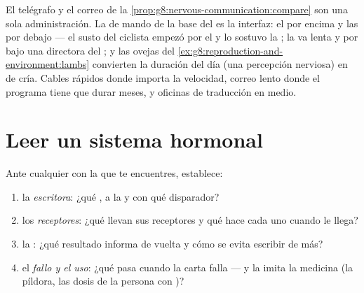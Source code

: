 \begin{remark}\label{rem:g8:hormonal-communication:partnership}
El telégrafo y el correo de la
\cref{prop:g8:nervous-communication:compare} son una sola
administración. La  de mando de la base del  es la
interfaz: el  por encima y las  por debajo ---
el susto del ciclista empezó por el  y lo sostuvo la ; la
 va lenta y por  bajo una directora del ; y las
ovejas del \cref{ex:g8:reproduction-and-environment:lambs} convierten
la duración del día (una percepción nerviosa) en  de cría.
Cables rápidos donde importa la velocidad, correo lento donde el
programa tiene que durar meses, y oficinas de traducción en medio.
\end{remark}

\section{Leer un sistema hormonal}

\begin{method}\label{met:g8:hormonal-communication:read}
Ante cualquier  con la que te encuentres, establece:
\begin{enumerate}
  \item la \emph{escritora}: ¿qué , a la  y con qué
        disparador?
  \item los \emph{receptores}: ¿qué  llevan sus
        receptores y qué hace cada uno cuando le llega?
  \item la \emph{}: ¿qué resultado informa de vuelta y
        cómo se evita escribir de más?
  \item el \emph{fallo y el uso}: ¿qué pasa cuando la carta falla ---
        y la imita la medicina (la píldora, las dosis de la persona con
        )?
\end{enumerate}
\end{method}

